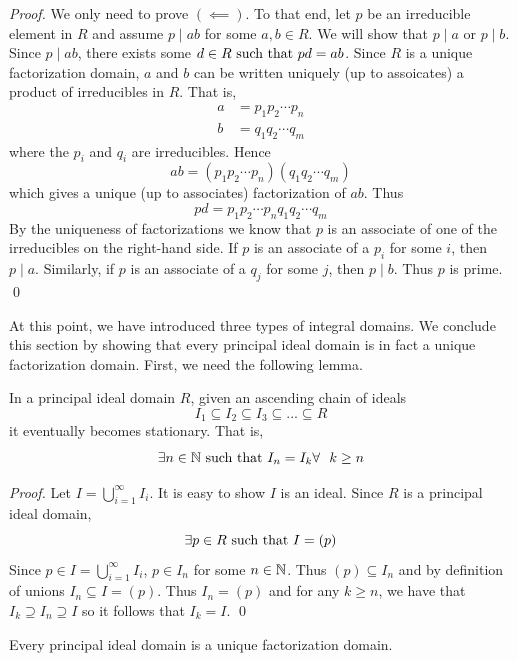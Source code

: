 \begin{proof}
    We only need to prove $(\impliedby)$. To that end, let $p$ be an irreducible element in $R$ and assume $p \mid ab$ for some $a,b\in R$. We will show that $p \mid a$ or $p \mid b$. Since $p \mid ab$, there exists some $d \in R \text{ such that } pd=ab$. Since $R$ is a unique factorization domain, $a$ and $b$ can be written uniquely (up to assoicates) a product of irreducibles in $R$. That is,
    \begin{align*}
        a &= p_1p_2\cdots p_n \\
        b &= q_1q_2\cdots q_m
    \end{align*}
    where the $p_i$ and $q_i$ are irreducibles. Hence 
    $$ab = (p_1p_2\cdots p_n)(q_1q_2\cdots q_m)$$
    which gives a unique (up to associates) factorization of $ab$. Thus
    $$pd = p_1p_2\cdots p_nq_1q_2\cdots q_m$$
    By the uniqueness of factorizations we know that $p$ is an associate of one of the irreducibles on the right-hand side. If $p$ is an associate of a $p_i$ for some $i$, then $p \mid a$. Similarly, if $p$ is an associate of a $q_j$ for some $j$, then $p \mid b$. Thus $p$ is prime.
    \qed
\end{proof}

At this point, we have introduced three types of integral domains. We conclude this section by showing that every principal ideal domain is in fact a unique factorization domain. First, we need the following lemma.

\begin{lemma}
    In a principal ideal domain $R$, given an ascending chain of ideals
    $$I_1 \subseteq I_2 \subseteq I_3 \subseteq ... \subseteq R$$
    it eventually becomes stationary. That is,
    $$\exists n \in \mathbb{N} \text{ such that } I_n = I_k \forall ~~k \geq n$$
\end{lemma}

\begin{proof}
    Let $I = \bigcup_{i=1}^\infty I_i$. It is easy to show $I$ is an ideal. Since $R$ is a principal ideal domain,
    $$\exists p \in R \text{ such that } I = (p)$$
    Since $p \in I = \bigcup_{i=1}^\infty I_i$, $p \in I_n$ for some $n \in \mathbb{N}$. Thus $(p) \subseteq I_n$ and by definition of unions $I_n \subseteq I = (p)$. Thus $I_n = (p)$ and for any $k \geq n$, we have that $I_k \supseteq I_n \supseteq I$ so it follows that $I_k = I$.
    \qed
\end{proof}

\begin{theorem}
    Every principal ideal domain is a unique factorization domain.
\end{theorem}

